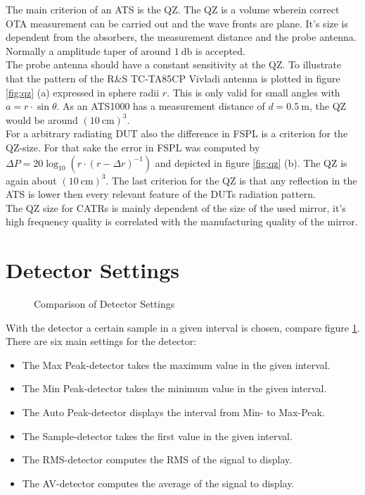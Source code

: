 The main criterion of an \ac{ATS} is the \ac{QZ}. The \ac{QZ} is a volume wherein correct \ac{OTA} measurement can be carried out and the wave fronts are plane. It's size is dependent from the absorbers, the measurement distance and the probe antenna. Normally a amplitude taper of around $\SI{1}{\decibel}$ is accepted.\\
The probe antenna should have a constant sensitivity at the \ac{QZ}. To illustrate that the pattern of the R\&{}S TC-TA85CP Vivladi antenna is plotted in figure \ref{fig:qz} (a) expressed in sphere radii $r$. This is only valid for small angles with $a=r\cdot\sin \theta$. As an ATS1000 has a measurement distance of $d = \SI{0.5}{\meter}$, the \ac{QZ} would be around $\left(\SI{10}{\centi\meter}\right)^3$.\\
For a arbitrary radiating \ac{DUT} also the difference in \ac{FSPL} is a criterion for the \ac{QZ}-size. For that sake the error in \ac{FSPL} was computed by $\Delta P = 20\log_{10}\left(r\cdot\left(r-\Delta r\right)^{-1}\right)$ and depicted in figure \ref{fig:qz} (b). The \ac{QZ} is again about $\left(\SI{10}{\centi\meter}\right)^3$. The last criterion for the \ac{QZ} is that any reflection in the \ac{ATS} is lower then every relevant feature of the \ac{DUT}s radiation pattern.\cite{ach}\\
The \ac{QZ} size for \acp{CATR} is mainly dependent of the size of the used mirror, it's high frequency quality is correlated with the manufacturing quality of the mirror.

\section{Detector Settings}

\begin{figure}[h]
\centering
\def\svgwidth{0.7\textwidth}

\caption{Comparison of Detector Settings \cite{funsspec}}
\label{fig:detset}
\end{figure}

With the detector a certain sample in a given interval is chosen, compare figure \ref{fig:detset}. There are six main settings for the detector: \cite{funsspec}
\begin{itemize}
\item The \textcolor[RGB]{237,28,36}{Max Peak-detector} takes the maximum value in the given interval.
\item The \textcolor[RGB]{0,166,88}{Min Peak-detector} takes the minimum value in the given interval.
\item The \textcolor[RGB]{0,94,138}{Auto Peak-detector} displays the interval from Min- to Max-Peak.
\item The \textcolor[RGB]{0,173,239}{Sample-detector} takes the first value in the given interval.
\item The \textcolor[RGB]{246,135,18}{RMS-detector} computes the \ac{RMS} of the signal to display.
\item The \textcolor[RGB]{114,100,184}{AV-detector} computes the average of the signal to display.
\end{itemize}

